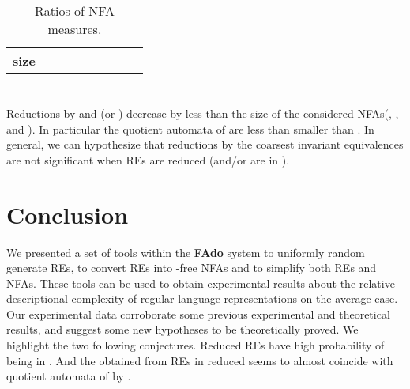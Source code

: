 \documentclass{llncs}
\newcommand{\FAdo}{{\bf FAdo}\xspace}
\newcommand{\NFA}{NFA\xspace}
\newcommand{\nfas}{NFAs\xspace}
\newcommand{\res}{REs\xspace}
\newcommand{\snf}{\mbox{}\xspace}
\begin{document}
\begin{table}
  \caption{Ratios of \NFA measures.}
  \label{tab:ratios}
  \centering
{\small
  \begin{tabular}{|r||r|r|r|r|r|r|r|r|}
    \hline{}
    size&&& &&&&&\\\hline
    &&&&&&&&\\
    &&&&&&&&\\
    &&&&&&&&\\
    &&&&&&&&\\\hline
  \end{tabular}
}
\vspace{-0.5cm}
\end{table}
Reductions by  and  (or
) decrease by less than  the size of the
considered \nfas (, , and ). In
particular the quotient automata of  are less than 
smaller than .  In general, we can hypothesize that
reductions by the coarsest invariant equivalences are not significant
when \res are reduced (and/or are in \snf).


\section{Conclusion}

We presented a set of tools within the \FAdo system to uniformly random
generate \res, to convert \res into -free \nfas and to 
simplify both \res and \nfas.  These tools can be
used to obtain experimental results about the relative descriptional
complexity of regular language representations on the average
case. Our experimental data corroborate some previous experimental and
theoretical results, and suggest some new hypotheses to be
theoretically proved. We highlight the two following
conjectures. Reduced \res have high probability of being
in \snf. And the  obtained from \res in reduced \snf seems to almost coincide
with quotient automata of  by .
\medskip
\end{document}
